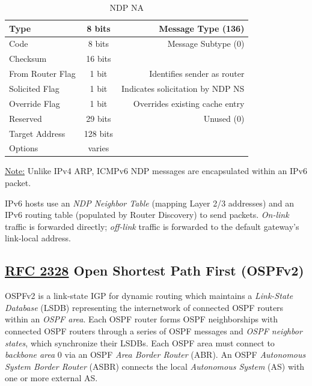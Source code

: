 \documentclass[12pt]{article}
\newif\ifcolor											%
\newcommand{\note}[1]{\ifcolor \colorbox{#1}{Note:}\else \underline{Note:}\fi}
\newcommand{\RFC}[1]{\href{https://datatracker.ietf.org/doc/html/rfc#1}{RFC #1}}
\begin{document}
	\begin{table}[H]
	\centering
	\caption{NDP NA \label{tab:NDP NA}}
	\begin{tabular}{| l | c | r |}\hline
	Type				& 8 bits	& Message Type (136)\\\hline
	Code				& 8 bits	& Message Subtype (0)\\\hline
	Checksum			& 16 bits	&\\\hline
	From Router Flag		& 1 bit 	& Identifies sender as router\\\hline
	Solicited Flag		& 1 bit 	& Indicates solicitation by NDP NS\\\hline
	Override Flag		& 1 bit 	& Overrides existing cache entry\\\hline
	Reserved			& 29 bits	& Unused (0)\\\hline
	Target Address		& 128 bits	&\\\hline
	Options			& varies	&\\\hline
	\end{tabular}\end{table}
	\note{Goldenrod} Unlike IPv4 ARP, ICMPv6 NDP messages are encapsulated within an IPv6 packet.

	IPv6 hosts use an \textit{NDP Neighbor Table} (mapping Layer 2/3 addresses) and an IPv6 routing table (populated by Router Discovery) to send packets. \textit{On-link} traffic is forwarded directly; \textit{off-link} traffic is forwarded to the default gateway's link-local address.


	\subsection[RFC 2328 OSPFv2]{\RFC{2328} Open Shortest Path First (OSPFv2) \label{subsec:OSPF}}
	OSPFv2 is a link-state IGP for dynamic routing which maintains a \textit{Link-State Database} (LSDB) representing the internetwork of connected OSPF routers within an \textit{OSPF area}. Each OSPF router forms OSPF neighborships with connected OSPF routers through a series of OSPF messages and \textit{OSPF neighbor states}, which synchronize their LSDBs. Each OSPF area must connect to \textit{backbone area} 0 via an OSPF \textit{Area Border Router} (ABR). An OSPF \textit{Autonomous System Border Router} (ASBR) connects the local \textit{Autonomous System} (AS) with one or more external AS.
\end{document}
